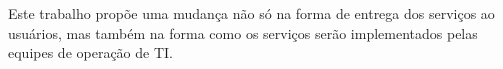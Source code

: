 \documentclass[quali]{mpit}
\begin{document}
Este trabalho propõe uma mudança não só na forma de entrega dos serviços ao usuários, mas também na forma como os serviços serão implementados pelas equipes de operação de TI. 

\end{document}
